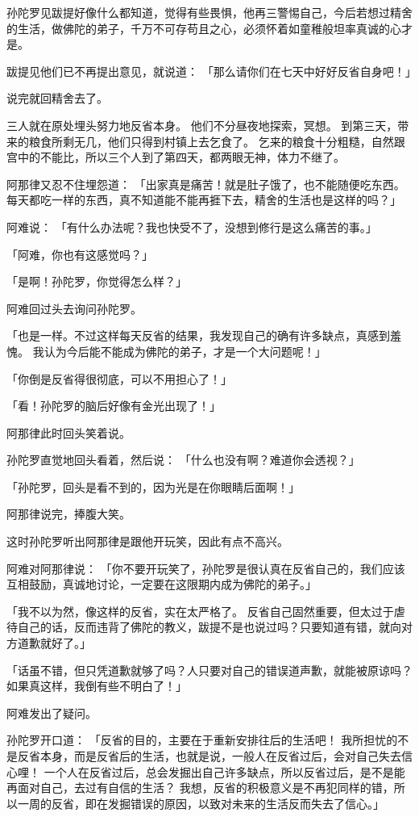 \documentclass[twoside,openany]{book}
\begin{document}
孙陀罗见跋提好像什么都知道，觉得有些畏惧，他再三警惕自己，今后若想过精舍的生活，做佛陀的弟子，千万不可存苟且之心，必须怀着如童稚般坦率真诚的心才是。

跋提见他们已不再提出意见，就说道：
「那么请你们在七天中好好反省自身吧！」

说完就回精舍去了。

三人就在原处埋头努力地反省本身。
他们不分昼夜地探索，冥想。
到第三天，带来的粮食所剩无几，他们只得到村镇上去乞食了。
乞来的粮食十分粗糙，自然跟宫中的不能比，所以三个人到了第四天，都两眼无神，体力不继了。

阿那律又忍不住埋怨道：
「出家真是痛苦！就是肚子饿了，也不能随便吃东西。
每天都吃一样的东西，真不知道能不能再捱下去，精舍的生活也是这样的吗？」

阿难说：
「有什么办法呢？我也快受不了，没想到修行是这么痛苦的事。」

「阿难，你也有这感觉吗？」

「是啊！孙陀罗，你觉得怎么样？」

阿难回过头去询问孙陀罗。

「也是一样。不过这样每天反省的结果，我发现自己的确有许多缺点，真感到羞愧。
我认为今后能不能成为佛陀的弟子，才是一个大问题呢！」

「你倒是反省得很彻底，可以不用担心了！」

「看！孙陀罗的脑后好像有金光出现了！」

阿那律此时回头笑着说。

孙陀罗直觉地回头看着，然后说：
「什么也没有啊？难道你会透视？」

「孙陀罗，回头是看不到的，因为光是在你眼睛后面啊！」

阿那律说完，捧腹大笑。

这时孙陀罗听出阿那律是跟他开玩笑，因此有点不高兴。

阿难对阿那律说：
「你不要开玩笑了，孙陀罗是很认真在反省自己的，我们应该互相鼓励，真诚地讨论，一定要在这限期内成为佛陀的弟子。」

「我不以为然，像这样的反省，实在太严格了。
反省自己固然重要，但太过于虐待自己的话，反而违背了佛陀的教义，跋提不是也说过吗？只要知道有错，就向对方道歉就好了。」

「话虽不错，但只凭道歉就够了吗？人只要对自己的错误道声歉，就能被原谅吗？如果真这样，我倒有些不明白了！」

阿难发出了疑问。

孙陀罗开口道：
「反省的目的，主要在于重新安排往后的生活吧！
我所担忧的不是反省本身，而是反省后的生活，也就是说，一般人在反省过后，会对自己失去信心哩！
一个人在反省过后，总会发掘出自己许多缺点，所以反省过后，是不是能再面对自己，去过有自信的生活？
我想，反省的积极意义是不再犯同样的错，所以一周的反省，即在发掘错误的原因，以致对未来的生活反而失去了信心。」
\end{document}
